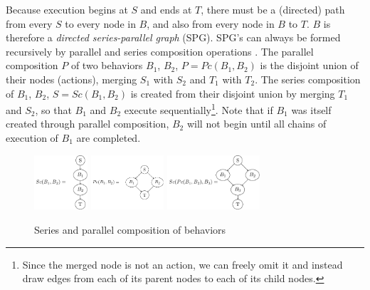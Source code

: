 \documentclass[conference]{IEEEtran}
\theoremstyle{definition}
\begin{document}
Because execution begins at \(S\) and ends at \(T\), there must be a
(directed) path from every \(S\) to every node in \(B\), and also from every node in \(B\)
to \(T\).  \(B\) is therefore a \textit{directed series-parallel graph} (SPG). SPG's
can always be formed recursively by parallel and series composition operations \cite{SPG}. The
parallel composition \(P\) of two behaviors \(B_1\), \(B_2\), \(P = Pc(B_1, B_2)\)
is the disjoint
union of their nodes (actions), merging \(S_1\) with \(S_2\) and \(T_1\) with \(T_2\). The series
composition of \(B_1\), \(B_2\), \(S = Sc(B_1, B_2)\) is created from their disjoint union by
merging \(T_1\) and \(S_2\), so that \(B_1\) and \(B_2\) execute sequentially\footnote{Since
the merged node is not an action, we can freely omit it and instead draw edges
from each of its parent nodes to each of its child nodes.}.  Note that if \(B_1\) was
itself created through parallel composition, \(B_2\) will not begin until all chains
of execution of \(B_1\) are completed.

\begin{figure}
\begin{center}
\includegraphics[height=0.8in]{images/tikz/series.pdf}
\includegraphics[height=0.8in]{images/tikz/parallel.pdf} \vspace{0.in}
\includegraphics[height=0.8in]{images/tikz/parallel-and-series.pdf}
\end{center}
\caption{Series and parallel composition of behaviors }
\label{fig:graph-composition}
\end{figure}
\end{document}
